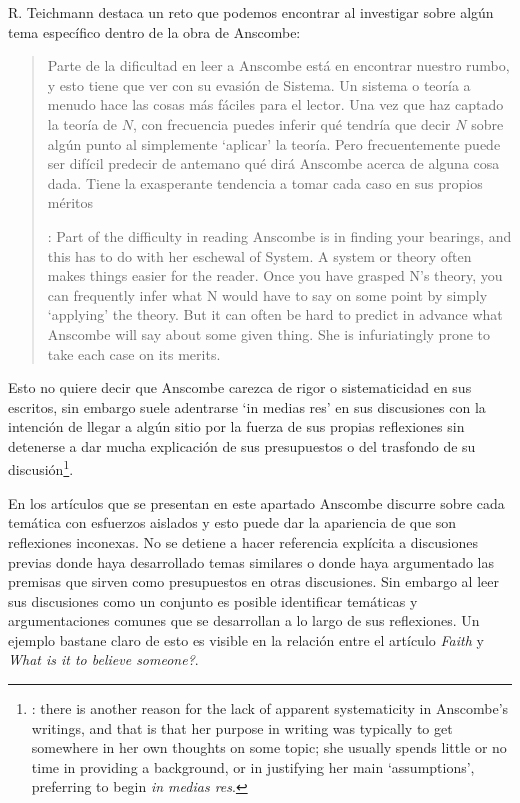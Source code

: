 R. Teichmann destaca un reto que podemos encontrar al investigar sobre algún tema específico dentro de la obra de Anscombe:
\blockquote[{\Cite[1]{teichmann2008ans}}: Part of the difficulty in reading Anscombe is in finding your bearings, and this has to do with her eschewal of System. A system or theory often makes things easier for the reader. Once you have grasped N's theory, you can frequently infer what N would have to say on some point by simply `applying' the theory. But it can often be hard to predict in advance what Anscombe will say about some given thing. She is infuriatingly prone to take each case on its merits.]
{Parte de la dificultad en leer a Anscombe está en encontrar nuestro rumbo, y esto tiene que ver con su evasión de Sistema. Un sistema o teoría a menudo hace las cosas más fáciles para el lector. Una vez que haz captado la teoría de $N$, con frecuencia puedes inferir qué tendría que decir $N$ sobre algún punto al simplemente \enquote*{aplicar} la teoría. Pero frecuentemente puede ser difícil predecir de antemano qué dirá Anscombe acerca de alguna cosa dada. Tiene la exasperante tendencia a tomar cada caso en sus propios méritos}. 
Esto no quiere decir que Anscombe carezca de rigor o sistematicidad en sus escritos, sin embargo suele adentrarse \enquote*{in medias res} en sus discusiones con la intención de llegar a algún sitio por la fuerza de sus propias reflexiones sin detenerse a dar mucha explicación de sus presupuestos o del trasfondo de su discusión\footnote{\Cite[Cf.][1]{teichmann2008ans}: \textelp{} there is another reason for the lack of apparent systematicity in Anscombe's writings, and that is that her purpose in writing was typically to get somewhere in her own thoughts on some topic; she usually spends little or no time in providing a background, or in justifying her main `assumptions', preferring to begin \emph{in medias res}.}.

En los artículos que se presentan en este apartado Anscombe discurre sobre cada temática con esfuerzos aislados y esto puede dar la apariencia de que son reflexiones inconexas. No se detiene a hacer referencia explícita a discusiones previas donde haya desarrollado temas similares o donde haya argumentado las premisas que sirven como presupuestos en otras discusiones. Sin embargo al leer sus discusiones como un conjunto es posible identificar temáticas y argumentaciones comunes que se desarrollan a lo largo de sus reflexiones. Un ejemplo bastane claro de esto es visible en la relación entre el artículo \emph{Faith} y \emph{What is it to believe someone?}.

